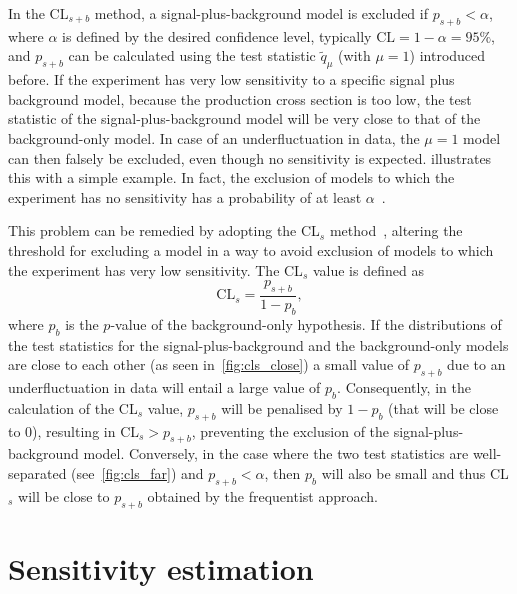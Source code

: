 In the CL$_{s+b}$ method, a signal-plus-background model is excluded if $p_{s+b} < \alpha$, where $\alpha$ is defined by the desired confidence level, typically $\mathrm{CL} = 1 - \alpha = 95\%$, and $p_{s+b}$ can be calculated using the test statistic $\tilde{q}_\mu$ (with $\mu = 1$) introduced before. If the experiment has very low sensitivity to a specific signal plus background model, \eg because the production cross section is too low, the test statistic of the signal-plus-background model will be very close to that of the background-only model. In case of an underfluctuation in data, the $\mu = 1$ model can then falsely be excluded, even though no sensitivity is expected.  illustrates this with a simple example. In fact, the exclusion of models to which the experiment has no sensitivity has a probability of at least $\alpha$~\cite{Cowan:2013pha}.

This problem can be remedied by adopting the CL$_s$ method~\cite{Read:2002hq}, altering the threshold for excluding a model in a way to avoid exclusion of models to which the experiment has very low sensitivity. The CL$_s$ value is defined as
\begin{equation}
	\mathrm{CL}_s = \frac{p_{s+b}}{1-p_b},
\end{equation}
where $p_b$ is the $p$-value of the background-only hypothesis. If the distributions of the test statistics for the signal-plus-background and the background-only models are close to each other (as seen in~\cref{fig:cls_close}) a small value of $p_{s+b}$ due to an underfluctuation in data will entail a large value of $p_b$. Consequently, in the calculation of the CL$_s$ value, $p_{s+b}$ will be penalised by $1-p_b$ (that will be close to 0), resulting in CL$_s > p_{s+b}$, preventing the exclusion of the signal-plus-background model. Conversely, in the case where the two test statistics are well-separated (see~\cref{fig:cls_far}) and $p_{s+b} < \alpha$, then $p_b$ will also be small and thus CL$_s$ will be close to $p_{s+b}$ obtained by the frequentist approach. 


\section{Sensitivity estimation}\label{sec:sensitivity_estimation}

